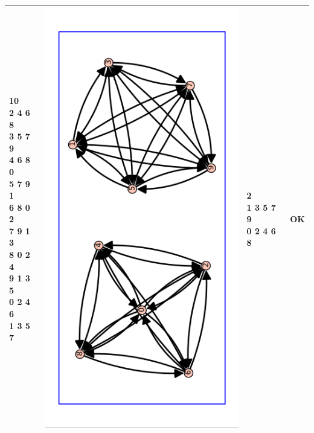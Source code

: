 \documentclass[a4paper,10pt]{article}
\begin{document}
\begin{center}
\begin{tabular}{|l|c|l|l|}
\shortstack[l]{
10\\
2 4 6 8\\
3 5 7 9\\
4 6 8 0\\
5 7 9 1\\
6 8 0 2\\
7 9 1 3\\
8 0 2 4\\
9 1 3 5\\
0 2 4 6\\
1 3 5 7
}
&\includegraphics[width=5 cm]{sample_data4}&
\shortstack[l]{
2\\
1 3 5 7 9\\
0 2 4 6 8 
}
&OK\\ \hline
\end{tabular}
\end{center}
\end{document}
